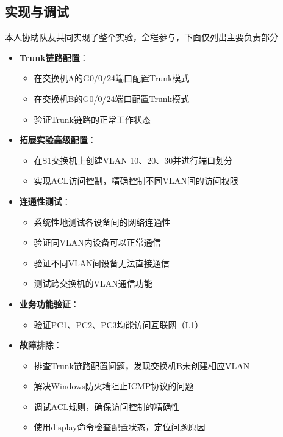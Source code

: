 \documentclass[a4paper]{article}
\begin{document}
\subsection{实现与调试}
本人协助队友共同实现了整个实验，全程参与，下面仅列出主要负责部分
\begin{itemize}
    \item \textbf{Trunk链路配置}：
    \begin{itemize}
        \item 在交换机A的G0/0/24端口配置Trunk模式
        \item 在交换机B的G0/0/24端口配置Trunk模式
        \item 验证Trunk链路的正常工作状态
    \end{itemize}
    \item \textbf{拓展实验高级配置}：
    \begin{itemize}
        \item 在S1交换机上创建VLAN 10、20、30并进行端口划分
        \item 实现ACL访问控制，精确控制不同VLAN间的访问权限
    \end{itemize}
    \item \textbf{连通性测试}：
    \begin{itemize}
        \item 系统性地测试各设备间的网络连通性
        \item 验证同VLAN内设备可以正常通信
        \item 验证不同VLAN间设备无法直接通信
        \item 测试跨交换机的VLAN通信功能
    \end{itemize}
    \item \textbf{业务功能验证}：
    \begin{itemize}
        \item 验证PC1、PC2、PC3均能访问互联网（L1）
    \end{itemize}
    \item \textbf{故障排除}：
    \begin{itemize}
        \item 排查Trunk链路配置问题，发现交换机B未创建相应VLAN
        \item 解决Windows防火墙阻止ICMP协议的问题
        \item 调试ACL规则，确保访问控制的精确性
        \item 使用display命令检查配置状态，定位问题原因
    \end{itemize}
\end{itemize}
\end{document}
